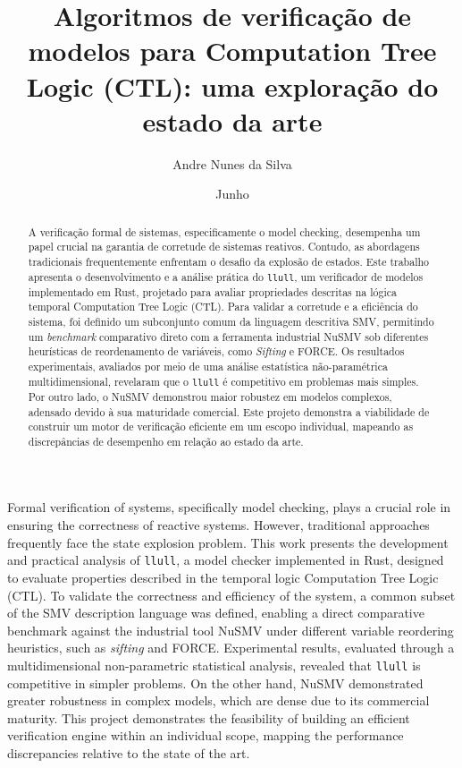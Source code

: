 \documentclass[cic,tc]{infufrgs}
\title{Algoritmos de verificação de modelos para Computation Tree Logic (CTL): uma exploração do estado da arte}
\author{Andre Nunes da Silva}{Nicolas}
\date{Junho}{2026}
\begin{document}
	
	\maketitle
	
	\begin{abstract}
		A verificação formal de sistemas, especificamente o model checking, desempenha um papel crucial na garantia de corretude de sistemas reativos. Contudo, as abordagens tradicionais frequentemente enfrentam o desafio da explosão de estados. Este trabalho apresenta o desenvolvimento e a análise prática do \texttt{llull}, um verificador de modelos implementado em Rust, projetado para avaliar propriedades descritas na lógica temporal Computation Tree Logic (CTL). Para validar a corretude e a eficiência do sistema, foi definido um subconjunto comum da linguagem descritiva SMV, permitindo um \textit{benchmark} comparativo direto com a ferramenta industrial NuSMV sob diferentes heurísticas de reordenamento de variáveis, como \textit{Sifting} e FORCE. Os resultados experimentais, avaliados por meio de uma análise estatística não-paramétrica multidimensional, revelaram que o \texttt{llull} é competitivo em problemas mais simples. Por outro lado, o NuSMV demonstrou maior robustez em modelos complexos, adensado devido à sua maturidade comercial. Este projeto demonstra a viabilidade de construir um motor de verificação eficiente em um escopo individual, mapeando as discrepâncias de desempenho em relação ao estado da arte.
	\end{abstract}
	
	\begin{translatedabstract}
		Formal verification of systems, specifically model checking, plays a crucial role in ensuring the correctness of reactive systems. However, traditional approaches frequently face the state explosion problem. This work presents the development and practical analysis of \texttt{llull}, a model checker implemented in Rust, designed to evaluate properties described in the temporal logic Computation Tree Logic (CTL). To validate the correctness and efficiency of the system, a common subset of the SMV description language was defined, enabling a direct comparative benchmark against the industrial tool NuSMV under different variable reordering heuristics, such as \textit{sifting} and FORCE. Experimental results, evaluated through a multidimensional non-parametric statistical analysis, revealed that \texttt{llull} is competitive in simpler problems. On the other hand, NuSMV demonstrated greater robustness in complex models, which are dense due to its commercial maturity. This project demonstrates the feasibility of building an efficient verification engine within an individual scope, mapping the performance discrepancies relative to the state of the art.
	\end{translatedabstract}
	
\end{document}
